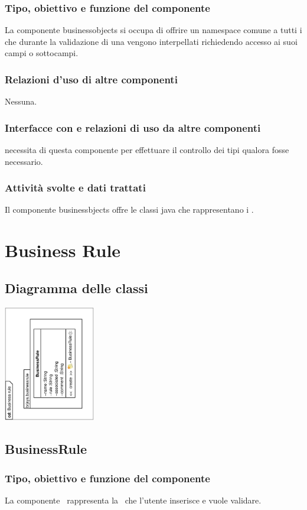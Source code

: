 \documentclass[11pt,titlepage,a4paper]{report}
\begin{document}
\subsubsection{Tipo, obiettivo e funzione del componente}
La componente businessobjects si occupa di offrire un namespace comune a tutti i \bos che durante la validazione di una \br vengono interpellati richiedendo accesso ai suoi campi o sottocampi.
\subsubsection{Relazioni d'uso di altre componenti}
Nessuna.
\subsubsection{Interfacce con e relazioni di uso da altre componenti}
\brp necessita di questa componente per effettuare il controllo dei tipi qualora fosse necessario.
\subsubsection{Attivit\`a svolte e dati trattati}
Il componente businessbjects offre le classi java che rappresentano i \bos.

\section{Business Rule}
\subsection{Diagramma delle classi}
\begin{center}
\includegraphics[width=0.3\textwidth, angle=-90]{DiagrammaClassi/Businessrule.eps}
\end{center}
\subsection{BusinessRule}
\subsubsection{Tipo, obiettivo e funzione del componente}
La componente \BR\ rappresenta la \br\ che l'utente inserisce e vuole validare.
\end{document}

